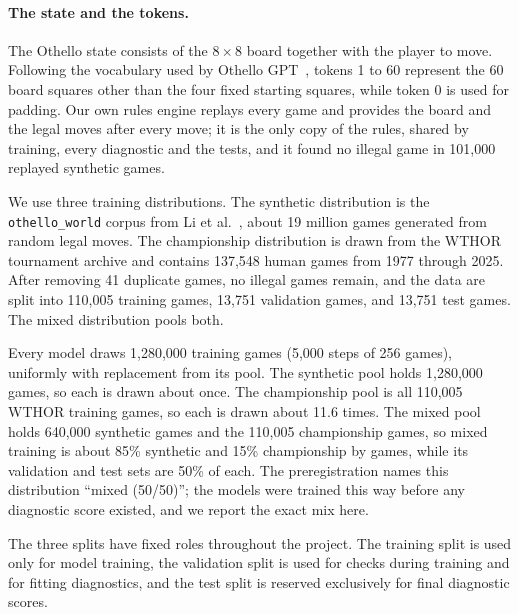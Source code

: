 \documentclass[11pt]{scrartcl}
\begin{document}
\paragraph{The state and the tokens.} The Othello state consists of the $8\times8$ board together with the player to move. Following the vocabulary
used by Othello GPT~\cite{li2023othello}, tokens 1 to 60 represent the 60 board squares other than the four
fixed starting squares, while token 0 is used for padding. Our own rules engine replays every game and
provides the board and the legal moves after every move; it is the only copy of the rules, shared by
training, every diagnostic and the tests, and it found no illegal game in 101,000 replayed synthetic games.

We use three training distributions. The synthetic distribution is the \texttt{othello\_world} corpus from
Li et al.~\cite{li2023othello}, about 19 million games generated from random legal moves. The championship
distribution is drawn from the WTHOR tournament archive and contains 137,548 human games from 1977 through
2025. After removing 41 duplicate games, no illegal games remain, and the data are split into 110,005
training games, 13,751 validation games, and 13,751 test games. The mixed distribution pools both.

Every model draws 1,280,000 training games (5,000 steps of 256 games), uniformly with replacement from its
pool. The synthetic pool holds 1,280,000 games, so each is drawn about once. The championship pool is all
110,005 WTHOR training games, so each is drawn about 11.6 times. The mixed pool holds 640,000 synthetic games
and the 110,005 championship games, so mixed training is about 85\% synthetic and 15\% championship by games,
while its validation and test sets are 50\% of each. The preregistration names this distribution ``mixed
(50/50)''; the models were trained this way before any diagnostic score existed, and we report the exact
mix here.

The three splits have fixed roles throughout the project. The training split is used only for model training,
the validation split is used for checks during training and for fitting diagnostics, and the test split is
reserved exclusively for final diagnostic scores.
\end{document}
